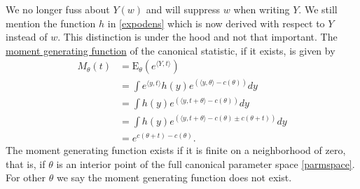 \documentclass[
]{article}
\begin{document}
We no longer fuss about \(Y(w)\) and will suppress \(w\) when writing
\(Y\). We still mention the function \(h\) in \eqref{expodens} which is
now derived with respect to \(Y\) instead of \(w\). This distinction is
under the hood and not that important. The
\href{https://en.wikipedia.org/wiki/Moment-generating_function}{moment
generating function} of the canonical statistic, if it exists, is given
by \begin{equation} \label{mgf}
\begin{split}
    M_\theta(t) &= \mathrm{E}_\theta\left(e^{\langle Y, t \rangle}\right) \\
      &= \int e^{\langle y, t \rangle} h(y)e^{\left(\langle y, \theta \rangle - c(\theta)\right)} dy \\
      &= \int h(y)e^{\left(\langle y, t + \theta \rangle - c(\theta)\right)}dy \\
      &= \int h(y)e^{\left(\langle y, t + \theta \rangle - c(\theta) \pm c(\theta + t)\right)}dy \\
      &= e^{c(\theta + t) - c(\theta)}.
\end{split}
\end{equation} The moment generating function exists if it is finite on
a neighborhood of zero, that is, if \(\theta\) is an interior point of
the full canonical parameter space \eqref{parmspace}. For other
\(\theta\) we say the moment generating function does not exist.
\end{document}
